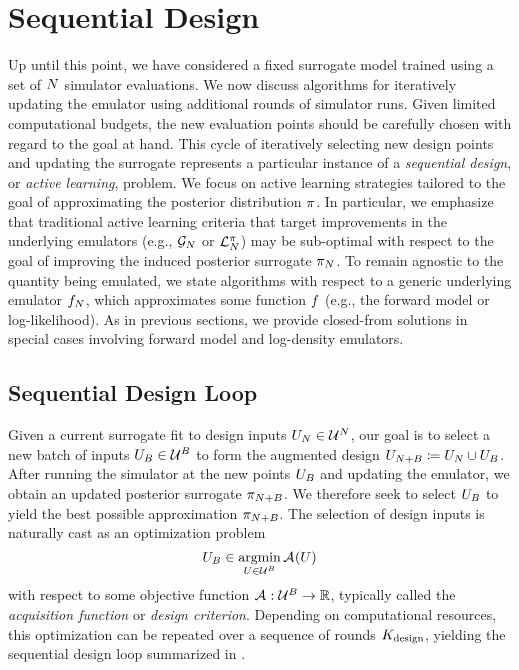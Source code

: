 \documentclass[12pt]{article}
\begin{document}
\section{Sequential Design} \label{sec:seq_design}
Up until this point, we have considered a fixed surrogate model trained using a set of
$\Ndesign$ simulator evaluations. We now discuss algorithms for iteratively 
updating the emulator using additional rounds of simulator runs. Given limited 
computational budgets, the new evaluation points should be carefully chosen with regard
to the goal at hand. This cycle of iteratively selecting new design points and updating 
the surrogate represents a particular instance of a \textit{sequential design},
or \textit{active learning}, problem. We focus on active learning strategies
tailored to the goal of approximating the posterior distribution $\postDens$. 
In particular, we emphasize that traditional active learning criteria
that target improvements in the underlying emulators 
(e.g., $\fwdEm[\Ndesign]$ or $\lpostEm[\Ndesign]$) may be sub-optimal with 
respect to the goal of improving the induced posterior surrogate $\postEm[\Ndesign]$.
To remain agnostic to the quantity being emulated, we state algorithms with respect to
a generic underlying emulator $\funcEm[\Ndesign]$, which approximates some function
$\func$ (e.g., the forward model or log-likelihood). As in previous sections,
we provide closed-from solutions in special cases involving forward model and
log-density emulators.

\subsection{Sequential Design Loop}
Given a current surrogate fit to design inputs $\designIn[\Ndesign] \in \parSpace^{\Ndesign}$,
our goal is to select a new batch of inputs $\designBatchIn \in \parSpace^{\Nbatch}$
to form the augmented design $\designIn[\Naugment] \Def \designIn[\Ndesign] \cup \designBatchIn$.
After running the simulator at the new points $\designBatchIn$ and updating the emulator, we obtain
an updated posterior surrogate $\postEm[\Naugment]$. We therefore seek to select $\designBatchIn$
to yield the best possible approximation $\postEm[\Naugment]$. The selection of design inputs is naturally
cast as an optimization problem 
\begin{equation}
\designBatchIn \in \argmin_{\parMat \in \parSpace^{\Nbatch}} \acq[](\parMat)
\label{eq:acq-opt}
\end{equation}
with respect to some objective function $\acq[]: \parSpace^{\Nbatch} \to \R$, typically
called the \textit{acquisition function} or \textit{design criterion}.
Depending on computational resources, this optimization can be repeated over a sequence of 
rounds $\Nrounds$, yielding the sequential design loop summarized in .
\end{document}
